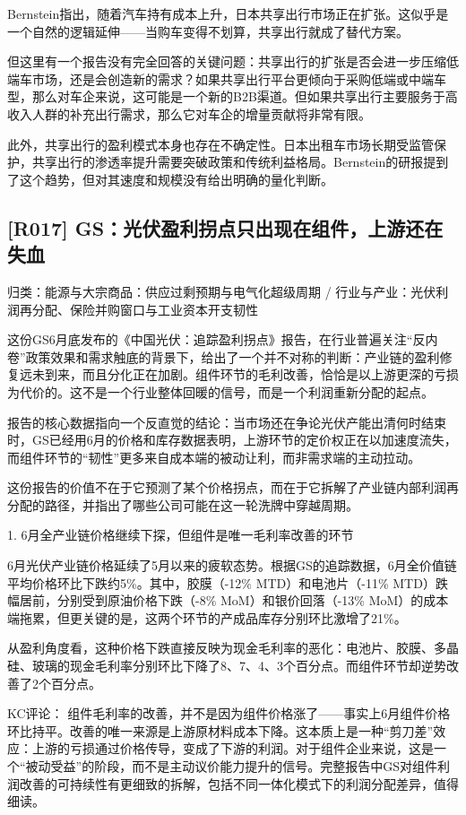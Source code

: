 \documentclass[11pt]{ctexart}
\begin{document}
Bernstein指出，随着汽车持有成本上升，日本共享出行市场正在扩张。这似乎是一个自然的逻辑延伸——当购车变得不划算，共享出行就成了替代方案。

但这里有一个报告没有完全回答的关键问题：共享出行的扩张是否会进一步压缩低端车市场，还是会创造新的需求？如果共享出行平台更倾向于采购低端或中端车型，那么对车企来说，这可能是一个新的B2B渠道。但如果共享出行主要服务于高收入人群的补充出行需求，那么它对车企的增量贡献将非常有限。

此外，共享出行的盈利模式本身也存在不确定性。日本出租车市场长期受监管保护，共享出行的渗透率提升需要突破政策和传统利益格局。Bernstein的研报提到了这个趋势，但对其速度和规模没有给出明确的量化判断。

\subsection{[R017] GS：光伏盈利拐点只出现在组件，上游还在失血}
{\small\color{refgray}归类：能源与大宗商品：供应过剩预期与电气化超级周期 / 行业与产业：光伏利润再分配、保险并购窗口与工业资本开支韧性}

这份GS6月底发布的《中国光伏：追踪盈利拐点》报告，在行业普遍关注“反内卷”政策效果和需求触底的背景下，给出了一个并不对称的判断：产业链的盈利修复远未到来，而且分化正在加剧。组件环节的毛利改善，恰恰是以上游更深的亏损为代价的。这不是一个行业整体回暖的信号，而是一个利润重新分配的起点。

报告的核心数据指向一个反直觉的结论：当市场还在争论光伏产能出清何时结束时，GS已经用6月的价格和库存数据表明，上游环节的定价权正在以加速度流失，而组件环节的“韧性”更多来自成本端的被动让利，而非需求端的主动拉动。

这份报告的价值不在于它预测了某个价格拐点，而在于它拆解了产业链内部利润再分配的路径，并指出了哪些公司可能在这一轮洗牌中穿越周期。

1. 6月全产业链价格继续下探，但组件是唯一毛利率改善的环节

6月光伏产业链价格延续了5月以来的疲软态势。根据GS的追踪数据，6月全价值链平均价格环比下跌约5\%。其中，胶膜（-12\% MTD）和电池片（-11\% MTD）跌幅居前，分别受到原油价格下跌（-8\% MoM）和银价回落（-13\% MoM）的成本端拖累，但更关键的是，这两个环节的产成品库存分别环比激增了21\%。

从盈利角度看，这种价格下跌直接反映为现金毛利率的恶化：电池片、胶膜、多晶硅、玻璃的现金毛利率分别环比下降了8、7、4、3个百分点。而组件环节却逆势改善了2个百分点。

KC评论： 组件毛利率的改善，并不是因为组件价格涨了——事实上6月组件价格环比持平。改善的唯一来源是上游原材料成本下降。这本质上是一种“剪刀差”效应：上游的亏损通过价格传导，变成了下游的利润。对于组件企业来说，这是一个“被动受益”的阶段，而不是主动议价能力提升的信号。完整报告中GS对组件利润改善的可持续性有更细致的拆解，包括不同一体化模式下的利润分配差异，值得细读。
\end{document}
